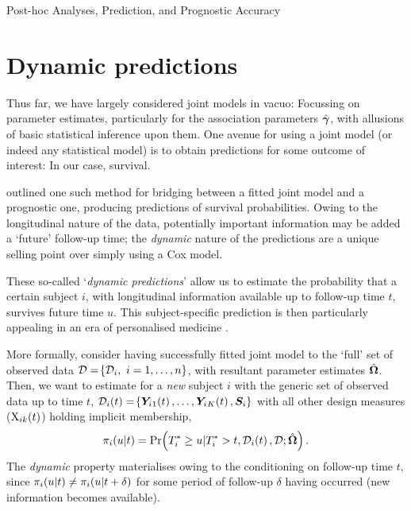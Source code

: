 \begin{chapter}{\label{cha:posthoc}Post-hoc Analyses, Prediction, and Prognostic Accuracy}
\section{Dynamic predictions}\label{sec:posthoc-dynpreds-intro}
Thus far, we have largely considered joint models in vacuo: Focussing on parameter estimates, particularly for the association parameters $\hat{\bm{\gamma}}$, with allusions of basic statistical inference upon them. One avenue for using a joint model (or indeed any statistical model) is to obtain predictions for some outcome of interest: In our case, survival.

\citet{Rizopoulos2011} outlined one such method for bridging between a fitted joint model and a prognostic one, producing predictions of survival probabilities. Owing to the longitudinal nature of the data, potentially important information may be added a `future' follow-up time; the \textit{dynamic} nature of the predictions are a unique selling point over \eg simply using a Cox model.  

These so-called `\textit{dynamic predictions}' allow us to estimate the probability that a certain subject $i$, with longitudinal information available up to follow-up time $t$, survives future time $u$. This subject-specific prediction is then particularly appealing in an era of personalised medicine \citep{RizopoulosJMbook}.

More formally, consider having successfully fitted joint model to the `full' set of observed data $\mathcal{D}=\lbr\mathcal{D}_i,\ i=1,\dots,n\rbr$, with resultant parameter estimates $\hat{\bm{\Omega}}$. Then, we want to estimate for a \textit{new} subject $i$ with the generic set of observed data up to time $t$, $\mathcal{D}_i\!\left( t\right)=\!\left\{\bm{Y}_i{_1}\!\left( t\right),\dots,\bm{Y}_i{_K}\!\left( t\right),\bm{S}_i\right\}$ with all other design measures (\eg $\mathrm{X}_{ik}\!\left( t\right)$) holding implicit membership,
\begin{equation}
    \pi_i\!\left( u|t\right) = \Pr\!\left( T_i^*\ge u|T_i^*>t,\mathcal{D}_i\!\left( t\right),\mathcal{D};\hat{\bm{\Omega}}\right).
\label{eq:posthoc-prob(u|t)}
\end{equation}
The \textit{dynamic} property materialises owing to the conditioning on follow-up time $t$, since $\pi_i\!\left( u|t\right)\neq\pi_i\!\left( u|t+\delta\right)$ for some period of follow-up $\delta$ having occurred (\ie new information becomes available). 


\end{chapter}
